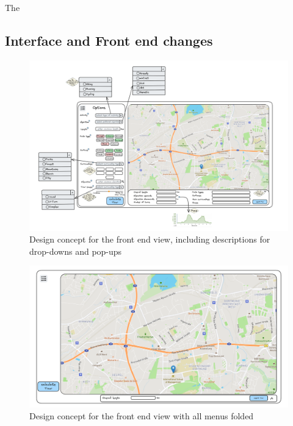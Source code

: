 The 


\subsection{Interface and Front end changes}
\label{subsec:interfaceAndFrontendChanges}

\begin{figure}[H]
	\includegraphics[width=0.9\linewidth]{bilder/Concept new Frontend design.png}
	\caption{Design concept for the front end view, including descriptions for drop-downs and pop-ups}
	\label{fig:frontendConcept}
\end{figure}


\begin{figure}[H]
	\includegraphics[width=0.9\linewidth]{bilder/Concept burger menu and stats hidden.png}
	\caption{Design concept for the front end view with all menus folded}
	\label{fig:frontendConceptMenusClosed}
\end{figure}


